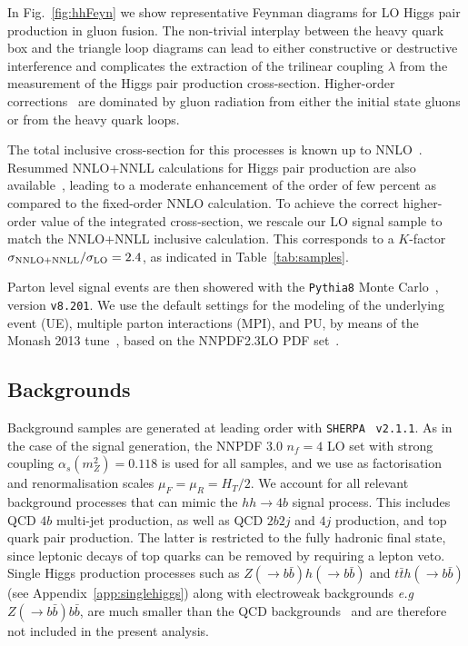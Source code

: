 In Fig.~\ref{fig:hhFeyn} we show representative Feynman diagrams
    for LO Higgs pair production in gluon fusion.
    The non-trivial interplay between the heavy quark box and the triangle loop diagrams
    can lead to either constructive or destructive interference
    and complicates the extraction of
    the trilinear coupling
    $\lambda$ from the measurement of the Higgs pair
    production cross-section.
    Higher-order corrections~\cite{deFlorian:2013jea,Frederix:2014hta}
    are dominated by gluon radiation
    from either the initial state gluons or from the heavy quark loops.

    The total inclusive cross-section for this processes is
    known up to NNLO~\cite{deFlorian:2013jea}.
    Resummed NNLO+NNLL calculations for Higgs pair production are
    also available~\cite{deFlorian:2015moa},
leading to a moderate enhancement of the order of
few percent as compared to the fixed-order NNLO calculation.
%
To achieve the correct higher-order value of the
integrated cross-section, we rescale our LO signal sample to match the
NNLO+NNLL
inclusive calculation.
%
This corresponds to
a $K$-factor $\sigma_{\rm NNLO+NNLL}/\sigma_{\rm LO}=2.4$, as indicated
in Table~\ref{tab:samples}.

Parton level signal events are then showered with the {\tt Pythia8} Monte
Carlo~\cite{Sjostrand:2007gs,Sjostrand:2014zea}, version {\tt v8.201}.
%
We use the default settings for the modeling
of the underlying event (UE), multiple parton
interactions (MPI), and PU, by means
of the Monash 2013 tune~\cite{Skands:2014pea},
based on the NNPDF2.3LO PDF set~\cite{Ball:2012cx,Ball:2013hta}.
%

\subsection{Backgrounds}

Background samples are generated at leading order
with {\tt SHERPA}~\cite{Gleisberg:2008ta} {\tt v2.1.1}.
%
As in the case of the signal generation,
the NNPDF 3.0 $n_f = 4$ LO set with strong coupling
$\alpha_s(m_Z^2)=0.118$ is used for all samples, and
we use as
factorisation and renormalisation scales $\mu_F=\mu_R=H_T/2$.
%
We account for all relevant background
processes that can mimic the
 $hh\to 4b$ signal process.
%
This includes  QCD $4b$ multi-jet production, as well as
QCD $2b2j$ and $4j$ production, and top quark pair
production.
%
The latter is restricted to the fully hadronic final state,
since 
leptonic decays of top quarks can be removed by requiring
a lepton veto.
%
Single Higgs production processes such as $Z(\to b\bar{b})h(\to b\bar{b})$
and $t\bar{t}h(\to b\bar{b})$ (see Appendix~\ref{app:singlehiggs})
along with electroweak backgrounds {\it e.g} $Z(\to b\bar{b})b\bar{b}$,
are much smaller than the
QCD backgrounds~\cite{Wardrope:2014kya,deLima:2014dta}
and are therefore not included in the present analysis.

